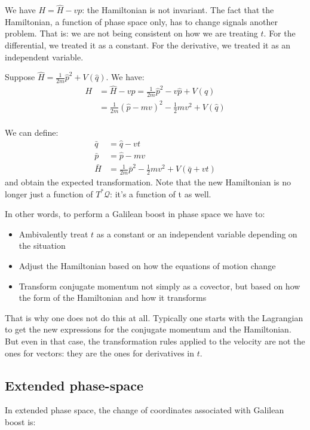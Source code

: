 \documentclass[aps,pra,10pt,twocolumn,floatfix,nofootinbib]{revtex4-1}
\theoremstyle{definition}
\begin{document}
We have $H = \hat{H} - vp$: the Hamiltonian is not invariant. The fact that the Hamiltonian, a function of phase space only, has to change signals another problem. That is: we are not being consistent on how we are treating $t$. For the differential, we treated it as a constant. For the derivative, we treated it as an independent variable.

Suppose $\hat{H} = \frac{1}{2m} \hat{p}^2 + V(\hat{q})$. We have:
\begin{align*}
H &= \hat{H} - vp = \frac{1}{2m} \hat{p}^2 -v\hat{p} + V(\hat{q})\\
&= \frac{1}{2m} (\hat{p} - mv)^2 - \frac{1}{2} mv^2 + V(\hat{q}) \\
\end{align*}

We can define:
\begin{align*}
\bar{q} &= \hat{q} - vt \\
\bar{p} &= \hat{p} - mv \\
\bar{H} &= \frac{1}{2m} \bar{p}^2 - \frac{1}{2} mv^2 + V(\bar{q} + vt)
\end{align*}
and obtain the expected transformation. Note that the new Hamiltonian is no longer just a function of $T^*\mathcal{Q}$: it's a function of t as well.

In other words, to perform a Galilean boost in phase space we have to:
\begin{itemize}
	\item Ambivalently treat $t$ as a constant or an independent variable depending on the situation
	\item Adjust the Hamiltonian based on how the equations of motion change
	\item Transform conjugate momentum not simply as a covector, but based on how the form of the Hamiltonian and how it transforms
\end{itemize}

That is why one does not do this at all. Typically one starts with the Lagrangian to get the new expressions for the conjugate momentum and the Hamiltonian. But even in that case, the transformation rules applied to the velocity are not the ones for vectors: they are the ones for derivatives in $t$.

\subsection{Extended phase-space}

In extended phase space, the change of coordinates associated with Galilean boost is:
\end{document}
